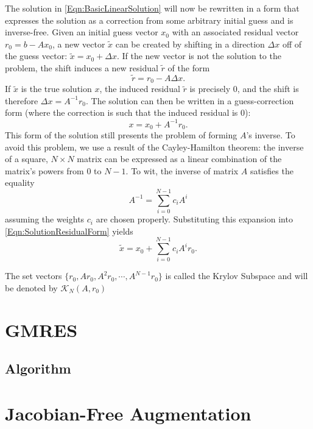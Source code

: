 \documentclass[Prelim,12pt]{WisconsinThesis}
\newcommand{\by}    {\!\times\!}
\newcommand{\dx}    {\ensuremath{\Delta{x}}}
\begin{document}
The solution in \cref{Eqn:BasicLinearSolution} will now be rewritten in a form that expresses the solution as a correction from some arbitrary initial guess and is inverse-free.
Given an initial guess vector $x_0$ with an associated residual vector $r_0 = b - A x_0$, a new vector $\tilde{x}$ can be created by shifting in a direction \dx{} off of the guess vector: $\tilde{x} = x_0 + \dx$.
If the new vector is not the solution to the problem, the shift induces a new residual $\tilde{r}$ of the form
\begin{equation}
    \tilde{r} = r_0  - A \dx.
    \label{Eqn:ResidualUpdateForm}
\end{equation}
If $\tilde{x}$ is the true solution $x$, the induced residual $\tilde{r}$ is precisely $0$, and the shift is therefore $\dx = A^{-1}r_0$.
The solution can then be written in a guess-correction form (where the correction is such that the induced residual is $0$):
\begin{equation}
     x = x_0 + A^{-1}r_0.
    \label{Eqn:SolutionResidualForm}
\end{equation}
This form of the solution still presents the problem of forming $A$'s inverse.
To avoid this problem, we use a result of the Cayley-Hamilton theorem: the inverse of a square, $N \by N$ matrix can be expressed as a linear combination of the matrix's powers from $0$ to $N-1$.
To wit, the inverse of matrix $A$ satisfies the equality
\begin{equation}
    A^{-1} = \sum_{i = 0}^{N-1} c_i A^i
\end{equation}
assuming the weights $c_i$ are chosen properly.
Substituting this expansion into \cref{Eqn:SolutionResidualForm} yields
\begin{equation}
    \tilde{x} = x_0 + \sum_{i = 0}^{N-1} c_i A^i r_0.
\end{equation}



The set vectors $\{r_0 , A r_0 ,A^2 r_0, \cdots ,A^{N-1} r_0\}$ is called the Krylov Subspace and will be denoted by $\mathcal{K}_N(A,r_0)$


\section{GMRES}
\subsection{Algorithm}


\section{Jacobian-Free Augmentation}
\end{document}
